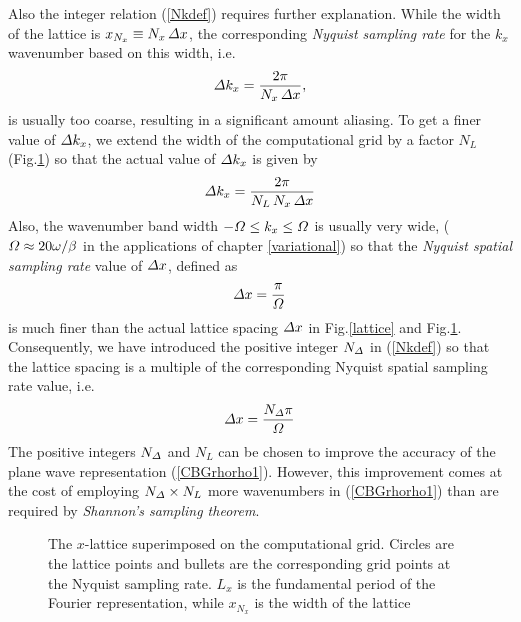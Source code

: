Also the integer relation (\ref{Nkdef}) requires further explanation.  While the width of the 
lattice is  $x_{N_x}\equiv   N_x\,{\mit \Delta }x$, the corresponding {\em Nyquist 
sampling rate\/} for the $k_x$ wavenumber based on this width, i.e.
\[
{\mit \Delta}k_x=\frac{2 \pi }{ N_x\,{\mit \Delta }x},
\]
is usually too coarse, resulting in a significant amount aliasing.  
To get a finer value of  ${\mit \Delta}k_x$, we extend the width 
of the computational grid by a factor ${N}_{L }$ (Fig.\ref{xlattice}) 
so that the actual value 
of ${\mit \Delta}k_x$ is given by
\[
{\mit \Delta}k_x=\frac{2 \pi }{N_L\, N_x\,{\mit \Delta }x}
\]
Also, the wavenumber band width $-{\mit \Omega} \le k_x \le {\mit 
\Omega}$ is usually very wide, (${\mit \Omega}\approx 20 \omega/\beta $ 
in the applications of chapter \ref{variational}) so that the  {\em Nyquist 
spatial sampling rate\/} value of ${\mit \Delta }x$, defined as
\[
{\mit \Delta }x=\frac{ \pi }{{\mit \Omega}} 
\]
is much finer than the actual lattice spacing ${\mit \Delta }x$ in 
Fig.\ref{lattice} and Fig.\ref{xlattice}. Consequently, we have introduced the 
positive integer ${N}_{\mit \Delta }$ in (\ref{Nkdef}) so that the 
lattice spacing is a multiple of the corresponding Nyquist spatial sampling rate 
value, i.e.
\[
{\mit \Delta }x=\frac{{N}_{\mit \Delta } \pi }{{\mit \Omega}} 
\]
The positive integers ${N}_{\mit \Delta }$ and  ${N}_{L }$ can be chosen 
to improve the accuracy of the plane wave representation (\ref{CBGrhorho1}). 
However, this  improvement comes at the cost of employing ${N}_{\mit 
\Delta }\times {N}_{L}$ more wavenumbers in (\ref{CBGrhorho1}) than are 
required by {\em Shannon's sampling theorem\/}.

\begin{figure}
\HideDisplacementBoxes
\centerline{}
\caption{The $x$-lattice superimposed on the computational grid.
 Circles are the lattice points and 
bullets are the corresponding grid points at the  Nyquist sampling rate. 
$L_x$ is the fundamental 
period of the Fourier representation, while $x_{N_x}$ is the width of the 
lattice}
\protect\label{xlattice}
\end{figure}

